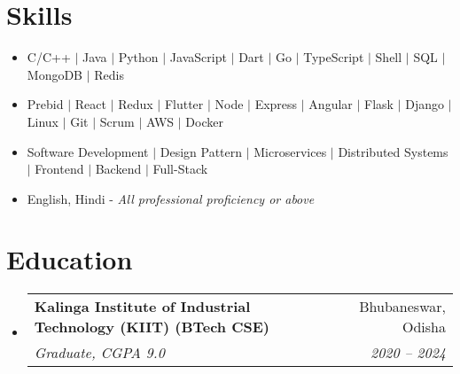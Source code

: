 \documentclass[letterpaper,11pt]{article}
\makeatletter
\newcommand{\resumeItem}[1]{
  \item\small{
    {#1 \vspace{-2pt}}
  }
}
\newcommand{\resumeSubheading}[4]{
  \vspace{-2pt}\item
    \begin{tabular*}{0.97\textwidth}[t]{l@{\extracolsep{\fill}}r}
      \textbf{#1} & #2 \\
      \textit{\small#3} & \textit{\small #4} \\
    \end{tabular*}\vspace{-7pt}
}
\newcommand{\resumeSubHeadingListStart}{\begin{itemize}[leftmargin=0.15in, label={}]}
\newcommand{\resumeSubHeadingListEnd}{\end{itemize}}
\newcommand{\resumeItemListStart}{\begin{itemize}}
\newcommand{\resumeItemListEnd}{\end{itemize}\vspace{-5pt}}
\makeatother
\begin{document}
\section{Skills}
    \begin{itemize}[leftmargin=0.15in, label={}]
        \small{\item{
            \resumeItemListStart
                \resumeItem{ C/C++ $|$ Java $|$ Python $|$ JavaScript $|$ Dart $|$ Go $|$ TypeScript $|$ Shell $|$ SQL $|$ MongoDB $|$ Redis}
                \resumeItem{ Prebid $|$ React $|$ Redux $|$ Flutter $|$ Node $|$ Express $|$ Angular $|$ Flask $|$ Django $|$ Linux $|$ Git $|$ Scrum $|$ AWS $|$ Docker}
                \resumeItem{ Software Development $|$ Design Pattern $|$ Microservices $|$ Distributed Systems $|$ Frontend $|$ Backend $|$ Full-Stack}
                \resumeItem{ English, Hindi - \textit{All professional proficiency or above}}
            \resumeItemListEnd
        }}
    \end{itemize}
 
\section{Education}
  \resumeSubHeadingListStart
    \resumeSubheading
      {Kalinga Institute of Industrial Technology (KIIT) (BTech CSE)} {Bhubaneswar, Odisha}
      {Graduate, CGPA 9.0}{2020 -- 2024}
  \resumeSubHeadingListEnd
\end{document}
